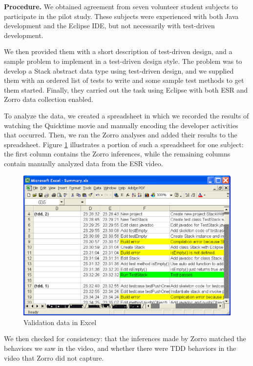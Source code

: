 \documentclass[smallextended]{svjour3}     %
\begin{document}
{\bf Procedure.}  We obtained agreement from seven volunteer student
subjects to participate in the pilot study. These subjects were experienced
with both Java development and the Eclipse IDE, but not necessarily with
test-driven development. 

We then provided them with a short description of test-driven design,
and a sample problem to implement in a test-driven design style.  The
problem was to develop a Stack abstract data type using test-driven design,
and we supplied them with an ordered list of tests to write and some sample
test methods to get them started.  Finally, they carried out the task using
Eclipse with both ESR and Zorro data collection enabled.

To analyze the data, we created a spreadsheet in which we recorded the
results of watching the Quicktime movie and manually encoding the developer
activities that occurred.  Then, we ran the Zorro analyses and added their
results to the spreadsheet.  Figure \ref{fig:VideoExcelScript} illustrates 
a portion of such a spreadsheet for one subject: the first column contains
the Zorro inferences, while the remaining columns contain manually analyzed
data from the ESR video.

\begin{figure}[htbp]
  \centering
  \includegraphics[width=1.0\textwidth]{VideoScriptExcel}
  \caption{Validation data in Excel}
  \label{fig:VideoExcelScript}
\end{figure}

We then checked for consistency: that the inferences made by Zorro matched
the behaviors we saw in the video, and whether there were TDD behaviors in
the video that Zorro did not capture.
\end{document}
